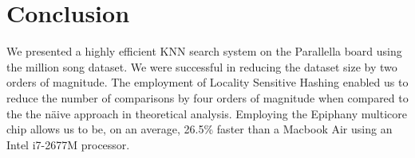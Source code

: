 \section{Conclusion}
\label{sec: conclusion}
We presented a highly efficient KNN search system on the Parallella board using the million song dataset. 
We were successful in reducing the dataset size by two orders of magnitude. 
The employment of Locality Sensitive Hashing enabled us to reduce the number of comparisons by four orders of magnitude when compared to the the n\"{a}ive approach in theoretical analysis.
Employing the Epiphany multicore chip allows us to be, on an average, 26.5\% faster than  a Macbook Air using an Intel i7-2677M processor.